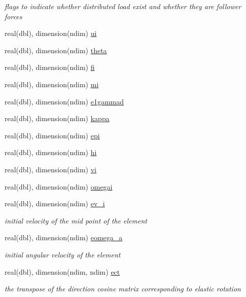 \begin{DoxyCompactItemize}
\begin{DoxyCompactList}\small\item\em flags to indicate whether distributed load exist and whether they are follower forces \end{DoxyCompactList}\item 
real(dbl), dimension(ndim) \hyperlink{namespaceelement_ad1b3c2d05a1c131831f0d4eef43f9105}{ui}
\item 
real(dbl), dimension(ndim) \hyperlink{namespaceelement_ac0a8fcda10d1b0af47fd7d713ebcd5fe}{theta}
\item 
real(dbl), dimension(ndim) \hyperlink{namespaceelement_aa97de262111f37b6e4b721cad221946a}{fi}
\item 
real(dbl), dimension(ndim) \hyperlink{namespaceelement_aaa8af943c974b60b3eeacd9ea685f28b}{mi}
\item 
real(dbl), dimension(ndim) \hyperlink{namespaceelement_aa1c0af00208b47c11ed5b1dc17fb33b3}{e1gammad}
\item 
real(dbl), dimension(ndim) \hyperlink{namespaceelement_ad5ea7346491c313bb4094d1838fe747e}{kappa}
\item 
real(dbl), dimension(ndim) \hyperlink{namespaceelement_afd7049cf1988fff1d20ea9fae6290b27}{epi}
\item 
real(dbl), dimension(ndim) \hyperlink{namespaceelement_aec782f88829f63bff819c43e9c19f02c}{hi}
\item 
real(dbl), dimension(ndim) \hyperlink{namespaceelement_a7e7198874f6dd0702abdd8ba0dfc7c2d}{vi}
\item 
real(dbl), dimension(ndim) \hyperlink{namespaceelement_ad819facefa1f1184a10576007ac79ba4}{omegai}
\item 
real(dbl), dimension(ndim) \hyperlink{namespaceelement_a38ecc4368e8e51d5672ad47f1a79536e}{ev\+\_\+i}
\begin{DoxyCompactList}\small\item\em initial velocity of the mid point of the element \end{DoxyCompactList}\item 
real(dbl), dimension(ndim) \hyperlink{namespaceelement_a8d354f7c393ef7f0ba4144a20b5390ba}{eomega\+\_\+a}
\begin{DoxyCompactList}\small\item\em initial angular velocity of the element \end{DoxyCompactList}\item 
real(dbl), dimension(ndim, ndim) \hyperlink{namespaceelement_a355b3273dce5e581cf75d079f4f4557d}{ect}
\begin{DoxyCompactList}\small\item\em the transpose of the direction cosine matrix corresponding to elastic rotation \end{DoxyCompactList}\item 

\end{DoxyCompactItemize}
